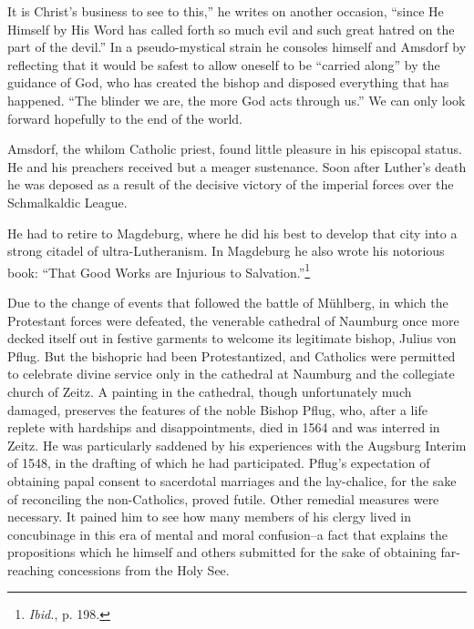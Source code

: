 It is Christ’s business to see to this,” he writes on another occasion, “since
He Himself by His Word has called forth so much evil and such great
hatred on the part of the devil.” In a pseudo-mystical strain he consoles
himself and Amsdorf by reflecting that it would be safest to allow oneself to be
“carried along” by the guidance of God, who has created the bishop and
disposed everything that has happened. “The blinder we are, the more God
acts through us.” We can only look forward hopefully to the end of the
world.

Amsdorf, the whilom Catholic priest, found little pleasure in his
episcopal status. He and his preachers received but a meager sustenance.
Soon after Luther’s death he was deposed as a result of the decisive victory
of the imperial forces over the Schmalkaldic League.

He had to retire to Magdeburg, where he did his best to develop that
city into a strong citadel of ultra-Lutheranism. In Magdeburg he also
wrote his notorious book: “That Good Works are Injurious to Salvation.”\footnote{\textit{Ibid.}, p. 198.}

Due to the change of events that followed the battle of Mühlberg,
in which the Protestant forces were defeated, the venerable cathedral
of Naumburg once more decked itself out in festive garments to welcome
its legitimate bishop, Julius von Pflug. But the bishopric had
been Protestantized, and Catholics were permitted to celebrate divine
service only in the cathedral at Naumburg and the collegiate church
of Zeitz. A painting in the cathedral, though unfortunately much
damaged, preserves the features of the noble Bishop Pflug, who, after
a life replete with hardships and disappointments, died in 1564 and
was interred in Zeitz. He was particularly saddened by his experiences
with the Augsburg Interim of 1548, in the drafting of which he had
participated. Pflug’s expectation of obtaining papal consent to sacerdotal
marriages and the lay-chalice, for the sake of reconciling the
non-Catholics, proved futile. Other remedial measures were necessary.
It pained him to see how many members of his clergy lived in
concubinage in this era of mental and moral confusion--a fact that
explains the propositions which he himself and others submitted
for the sake of obtaining far-reaching concessions from the Holy
See.

